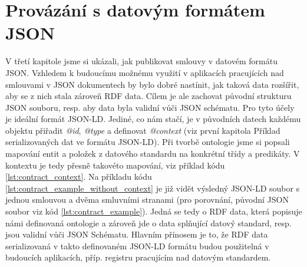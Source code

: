 \section{Provázání s datovým formátem JSON}

V třetí kapitole jsme si ukázali, jak publikovat smlouvy v datovém formátu JSON. Vzhledem k budoucímu možnému využití v aplikacích pracujících nad smlouvami v JSON dokumentech by bylo dobré nastínit, jak taková data rozšířit, aby se z nich stala zároveň RDF data. Cílem je ale zachovat původní strukturu JSON souboru, resp. aby data byla validní vůči JSON schématu. Pro tyto účely je ideální formát JSON-LD. Jediné, co nám stačí, je v původních datech každému objektu přiřadit \textit{@id}, \textit{@type} a definovat \textit{@context} (viz první kapitola Příklad serializovaných dat ve formátu JSON-LD). Při tvorbě ontologie jsme si popsali mapování entit a položek z datového standardu na konkrétní třídy a predikáty. V kontextu je tedy přesně takovéto mapování, viz příklad kódu \ref{lst:contract_context}. Na příkladu kódu \ref{lst:contract_example_without_context} je již vidět výsledný JSON-LD soubor s jednou smlouvou a dvěma smluvními stranami (pro porovnání, původní JSON soubor viz kód \ref{lst:contract_example}). Jedná se tedy o RDF data, která popisuje námi definovaná ontologie a zároveň jde o data splňující datový standard, resp. jsou validní vůči JSON Schématu. Hlavním přínosem je to, že RDF data serializovaná v takto definovaném JSON-LD formátu budou použitelná v budoucích aplikacích, příp. registru pracujícím nad datovým standardem.



